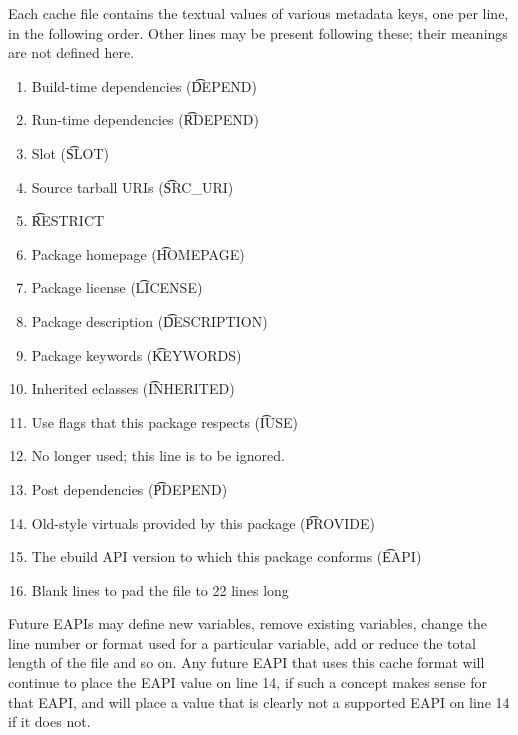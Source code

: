 Each cache file contains the textual values of various metadata keys, one per line, in the following
order. Other lines may be present following these; their meanings are not defined here.

\begin{enumerate}
\item Build-time dependencies (\t{DEPEND})
\item Run-time dependencies (\t{RDEPEND})
\item Slot (\t{SLOT})
\item Source tarball URIs (\t{SRC\_URI})
\item \t{RESTRICT}
\item Package homepage (\t{HOMEPAGE})
\item Package license (\t{LICENSE})
\item Package description (\t{DESCRIPTION})
\item Package keywords (\t{KEYWORDS})
\item Inherited eclasses (\t{INHERITED})
\item Use flags that this package respects (\t{IUSE})
\item No longer used; this line is to be ignored.
\item Post dependencies (\t{PDEPEND})
\item Old-style virtuals provided by this package (\t{PROVIDE})
\item The ebuild API version to which this package conforms (\t{EAPI})
\item Blank lines to pad the file to 22 lines long
\end{enumerate}

Future EAPIs may define new variables, remove existing variables, change the line number or
format used for a particular variable, add or reduce the total length of the file and so on.
Any future EAPI that uses this cache format will continue to place the EAPI value on
line 14, if such a concept makes sense for that EAPI, and will place a value that is clearly
not a supported EAPI on line 14 if it does not.

